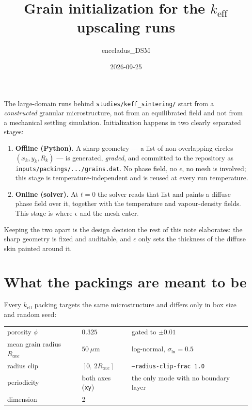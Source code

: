 \documentclass[11pt]{article}
\title{Grain initialization for the $k_{\text{eff}}$ upscaling runs}
\author{enceladus\_DSM}
\date{2026-09-25}
\newcommand{\code}[1]{\texttt{\small #1}}
\begin{document}
\maketitle

\noindent
The large-domain runs behind \code{studies/keff\_sintering/} start from a
\emph{constructed} granular microstructure, not from an equilibrated field
and not from a mechanical settling simulation. Initialization happens in
two clearly separated stages:

\begin{enumerate}
  \item \textbf{Offline (Python).} A sharp geometry --- a list of
    non-overlapping circles $(x_k, y_k, R_k)$ --- is generated,
    \emph{graded}, and committed to the repository as
    \code{inputs/packings/.../grains.dat}. No phase field, no $\epsilon$,
    no mesh is involved; this stage is temperature-independent and is
    reused at every run temperature.
  \item \textbf{Online (solver).} At $t=0$ the solver reads that list and
    paints a diffuse phase field over it, together with the temperature
    and vapour-density fields. This stage is where $\epsilon$ and the mesh
    enter.
\end{enumerate}

\noindent
Keeping the two apart is the design decision the rest of this note
elaborates: the sharp geometry is fixed and auditable, and $\epsilon$ only
sets the thickness of the diffuse skin painted around it.

\section{What the packings are meant to be}

Every $k_{\text{eff}}$ packing targets the same microstructure and differs
only in box size and random seed:

\begin{center}
\begin{tabular}{lll}
\toprule
porosity $\phi$            & $0.325$                    & gated to $\pm 0.01$ \\
mean grain radius $R_{ave}$ & $50\ \mu$m                & log-normal, $\sigma_{\ln} = 0.5$ \\
radius clip                & $[0,\,2R_{ave}]$           & \code{--radius-clip-frac 1.0} \\
periodicity                & both axes (\code{xy})      & the only mode with no boundary layer \\
dimension                  & 2                          & \\
\bottomrule
\end{tabular}
\end{center}
\end{document}
